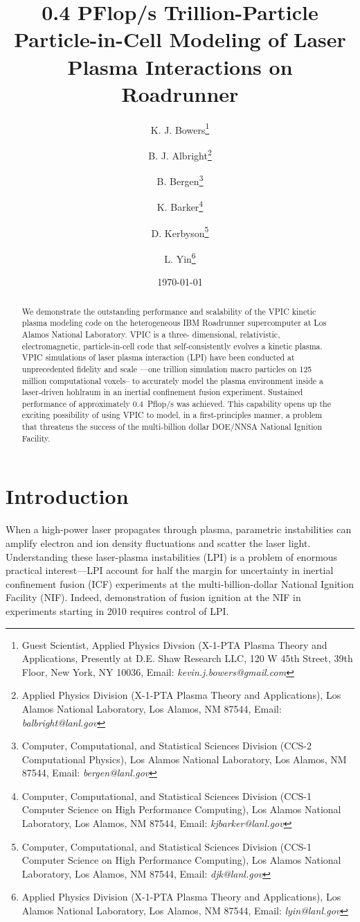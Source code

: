 \documentclass[10pt]{article}
\title{0.4 PFlop/s Trillion-Particle Particle-in-Cell Modeling of Laser Plasma Interactions on Roadrunner}
\author{%
K. J. Bowers\thanks{Guest Scientist, Applied Physics Divsion (X-1-PTA Plasma Theory and Applications, Presently at D.E. Shaw Research LLC, 120 W 45th Street, 39th Floor, New York, NY 10036, Email: \emph{kevin.j.bowers@gmail.com}} \and%
%
B. J. Albright\thanks{Applied Physics Division (X-1-PTA Plasma Theory and Applications), Los Alamos National Laboratory, Los Alamos, NM 87544, Email: \emph{balbright@lanl.gov}} \and%
%
B. Bergen\thanks{Computer, Computational, and Statistical Sciences Division (CCS-2 Computational Physics), Los Alamos National Laboratory, Los Alamos, NM 87544, Email: \emph{bergen@lanl.gov}} \and%
%
K. Barker\thanks{Computer, Computational, and Statistical Sciences Division (CCS-1 Computer Science on High Performance Computing), Los Alamos National Laboratory, Los Alamos, NM 87544, Email: \emph{kjbarker@lanl.gov}} \and%
%
D. Kerbyson\thanks{Computer, Computational, and Statistical Sciences Division (CCS-1 Computer Science on High Performance Computing), Los Alamos National Laboratory, Los Alamos, NM 87544, Email: \emph{djk@lanl.gov}} \and%
%
L. Yin\thanks{Applied Physics Division (X-1-PTA Plasma Theory and Applications), Los Alamos National Laboratory, Los Alamos, NM 87544, Email: \emph{lyin@lanl.gov}}}
\date{\today}
\begin{document}
\maketitle
\thispagestyle{empty}

\begin{singlespace}
\begin{abstract}
We demonstrate the outstanding performance and scalability of the VPIC 
kinetic plasma modeling code on the heterogeneous IBM Roadrunner 
supercomputer at Los Alamos National Laboratory.  VPIC is a three-
dimensional, relativistic, electromagnetic, particle-in-cell code that 
self-consistently evolves a kinetic plasma.  VPIC simulations of laser 
plasma interaction (LPI) have been conducted at unprecedented fidelity 
and scale ---one trillion simulation macro particles on 125 million 
computational voxels-- to accurately model the plasma environment 
inside a laser-driven hohlraum in an inertial confinement fusion 
experiment.   Sustained performance of approximately 0.4~Pflop/s was 
achieved.  This capability opens up the exciting possibility of using 
VPIC to model, in a first-principles manner, a problem that threatens 
the success of the multi-billion dollar DOE/NNSA National Ignition Facility.  
\end{abstract}
\end{singlespace}

\pagebreak

\section*{Introduction}

When a high-power laser propagates through plasma,
parametric instabilities can amplify electron and ion density fluctuations
and scatter the laser light.  Understanding these laser-plasma instabilities (LPI) 
is a problem of enormous practical interest---LPI account for half 
the margin for uncertainty in inertial confinement fusion (ICF) experiments 
at the multi-billion-dollar National Ignition Facility (NIF).  Indeed, 
demonstration of fusion ignition at the NIF in experiments starting in 
2010 requires control of LPI.  
\end{document}
